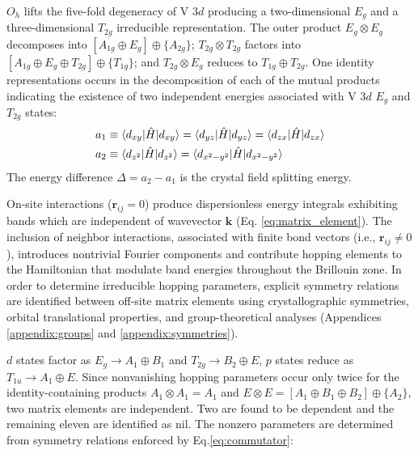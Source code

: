 \documentclass[twocolumn,showpacs,preprintnumbers,superscriptaddress,prb,floatfix,aps,10pt]{revtex4-1}
\renewcommand{\vec}[1]{\ensuremath{\mathbf{#1}}}
\newcommand*{\ham}{\hat{H}}
\begin{document}
$O_h$ lifts the five-fold degeneracy of V 3$d$ producing a two-dimensional $E_g$ and a three-dimensional $T_{2g}$ irreducible representation. The outer product $E_g \otimes E_g$ decomposes into $[A_{1g} \oplus E_g] \oplus \{A_{2g}\}$; $T_{2g} \otimes T_{2g}$ factors into $[A_{1g} \oplus E_{g} \oplus T_{2g}] \oplus \{T_{1g}\}$; and $T_{2g} \otimes E_g$ reduces to $T_{1g} \oplus T_{2g}$. One identity representations occurs in the decomposition of each of the mutual products indicating the existence of two independent energies associated with V 3$d$ $E_g$ and $T_{2g}$ states:
%
\begin{align}
\begin{split}
a_1&\equiv\braket{d_{xy}|\ham|d_{xy}}=\braket{d_{yz}|\ham|d_{yz}}=\braket{d_{zx}|\ham|d_{zx}}\\
a_2&\equiv\braket{d_{z^2}|\ham|d_{z^2}}=\braket{d_{x^2-y^2}|\ham|d_{x^2-y^2}}\\
\end{split}
\end{align}
%
The energy difference $\Delta = a_2 - a_1$ is the crystal field splitting energy. 

On-site interactions ($\vec{r}_{ij} = 0$) produce dispersionless energy integrals exhibiting bands which are independent of wavevector $\vec{k}$ (Eq. \ref{eq:matrix_element}). The inclusion of neighbor interactions, associated with finite bond vectors (i.e., $\vec{r}_{ij} \neq 0$), introduces nontrivial Fourier components and contribute hopping elements to the Hamiltonian that modulate band energies throughout the Brillouin zone. In order to determine irreducible hopping parameters, explicit symmetry relations are identified between off-site matrix elements using crystallographic symmetries, orbital translational properties, and group-theoretical analyses (Appendices \ref{appendix:groups} and \ref{appendix:symmetries}). 













$d$ states factor as $E_g \rightarrow A_1 \oplus B_1$ and $T_{2g} \rightarrow B_2 \oplus E$, $p$ states reduce as $T_{1u} \rightarrow A_1 \oplus E$. Since nonvanishing hopping parameters occur only twice for the identity-containing products $A_1 \otimes A_1 = A_1$ and $E \otimes E = [ A_1 \oplus B_1 \oplus B_2 ] \oplus \{ A_2 \}$, two matrix elements are independent. Two are found to be dependent and the remaining eleven are identified as nil. The nonzero parameters are determined from symmetry relations enforced by Eq.\ref{eq:commutator}:
\end{document}
